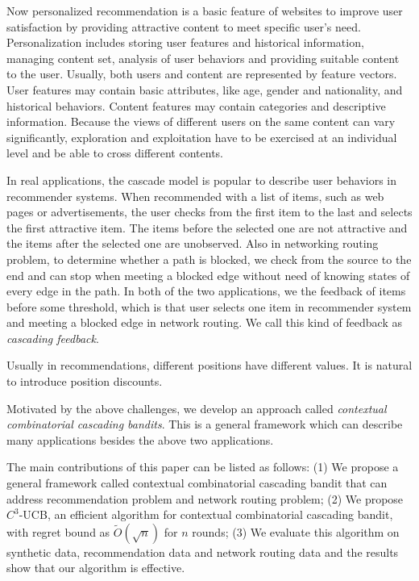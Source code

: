 \documentclass{article}
\begin{document}
Now personalized recommendation is a basic feature of websites to improve user satisfaction by providing attractive content to meet specific user's need. Personalization includes storing user features and historical information, managing content set, analysis of user behaviors and providing suitable content to the user. Usually, both users and content are represented by feature vectors. User features may contain basic attributes, like age, gender and nationality, and historical behaviors. Content features may contain categories and descriptive information. Because the views of different users on the same content can vary significantly, exploration and exploitation have to be exercised at an individual level and be able to cross different contents.

In real applications, the cascade model is popular to describe user behaviors in recommender systems. When recommended with a list of items, such as web pages or advertisements, the user checks from the first item to the last and selects the first attractive item. The items before the selected one are not attractive and the items after the selected one are unobserved. Also in networking routing problem, to determine whether a path is blocked, we check from the source to the end and can stop when meeting a blocked edge without need of knowing states of every edge in the path. In both of the two applications, we the feedback of items before some threshold, which is that user selects one item in recommender system and meeting a blocked edge in network routing. We call this kind of feedback as {\it cascading feedback}. 

Usually in recommendations, different positions have different values. It is natural to introduce position discounts.

Motivated by the above challenges, we develop an approach called {\it contextual combinatorial cascading bandits}. This is a general framework which can describe many applications besides the above two applications.

The main contributions of this paper can be listed as follows: (1) We propose a general framework called contextual combinatorial cascading bandit that can address recommendation problem and network routing problem; (2) We propose $C^3$-UCB, an efficient algorithm for contextual combinatorial cascading bandit, with regret bound as $\tilde{O}(\sqrt{n})$ for $n$ rounds; (3) We evaluate this algorithm on synthetic data, recommendation data and network routing data and the results show that our algorithm is effective.
\end{document}
